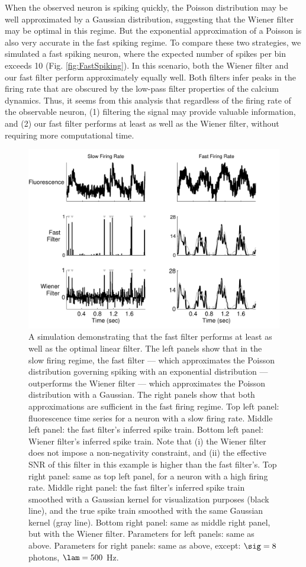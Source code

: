 When the observed neuron is spiking quickly, the Poisson distribution may be well approximated by a Gaussian distribution, suggesting that the Wiener filter may be optimal in this regime.  But the exponential approximation of a Poisson is also very accurate in the fast spiking regime.  To compare these two strategies, we simulated a fast spiking neuron, where the expected number of spikes per bin exceeds 10 (Fig. \ref{fig:FastSpiking}). In this scenario, both the Wiener filter and our fast filter perform approximately equally well.  Both filters infer peaks in the firing rate that are obscured by the low-pass filter properties of the calcium dynamics. Thus, it seems from this analysis that regardless of the firing rate of the observable neuron, (1) filtering the signal may provide valuable information, and (2) our fast filter performs at least as well as the Wiener filter, without requiring more computational time.


\begin{figure}[H]
\centering \includegraphics[width=.9\linewidth]{../graphics/wiener}
\caption{A simulation demonstrating that the fast filter performs at least as well as the optimal linear filter. The left panels show that in the slow firing  regime, the fast filter --- which approximates the Poisson distribution governing spiking with an exponential distribution  --- outperforms the Wiener filter --- which approximates the Poisson distribution with a Gaussian.  The right panels show that both approximations are sufficient in the fast firing regime. Top left panel: fluorescence time series for a neuron with a slow firing rate.  Middle left panel: the fast filter's inferred spike train.  Bottom left panel: Wiener filter's inferred spike train.  Note that (i) the Wiener filter does not impose a non-negativity constraint, and (ii) the effective SNR of this filter in this example is higher than the fast filter's.  Top right panel: same as top left panel, for a neuron with a high firing rate.  Middle right panel: the fast filter's inferred spike train smoothed with a Gaussian kernel for visualization purposes (black line), and the true spike train smoothed with the same Gaussian kernel (gray line).  Bottom right panel: same as middle right panel, but with the Wiener filter. Parameters for left panels: same as above.  Parameters for right panels: same as above, except: $\sig=8$ photons, $\lam=500$ Hz.} \label{fig:wiener}
\end{figure}

